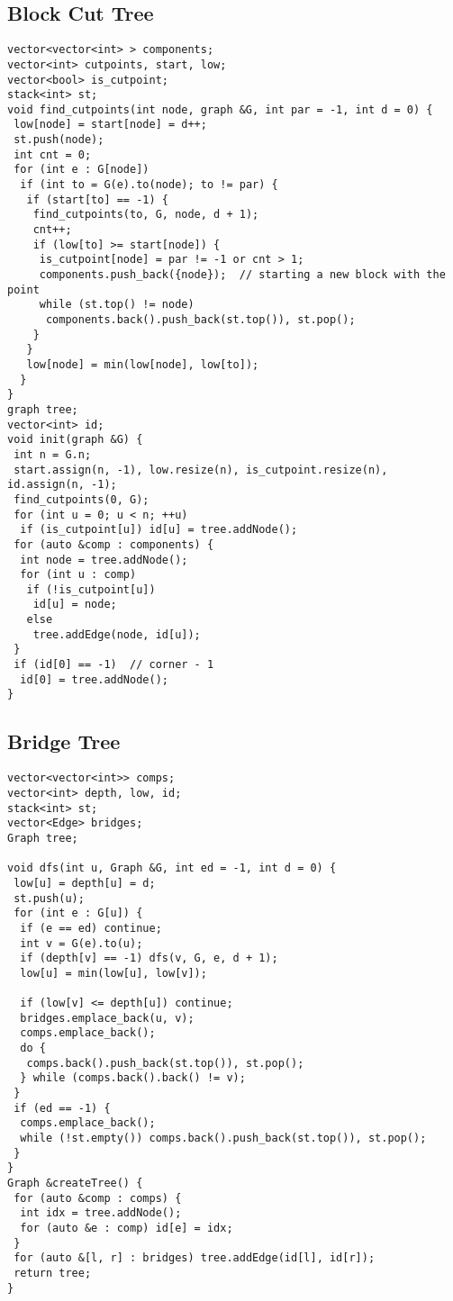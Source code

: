 \documentclass[a4paper,11pt,oneside]{article}
\begin{document}
\begin{multicols*}{\COLS}
\subsection{Block Cut Tree}
\begin{lstlisting}
vector<vector<int> > components;
vector<int> cutpoints, start, low;
vector<bool> is_cutpoint;
stack<int> st;
void find_cutpoints(int node, graph &G, int par = -1, int d = 0) {
 low[node] = start[node] = d++;
 st.push(node);
 int cnt = 0;
 for (int e : G[node])
  if (int to = G(e).to(node); to != par) {
   if (start[to] == -1) {
    find_cutpoints(to, G, node, d + 1);
    cnt++;
    if (low[to] >= start[node]) {
     is_cutpoint[node] = par != -1 or cnt > 1;
     components.push_back({node});  // starting a new block with the point
     while (st.top() != node)
      components.back().push_back(st.top()), st.pop();
    }
   }
   low[node] = min(low[node], low[to]);
  }
}
graph tree;
vector<int> id;
void init(graph &G) {
 int n = G.n;
 start.assign(n, -1), low.resize(n), is_cutpoint.resize(n), id.assign(n, -1);
 find_cutpoints(0, G);
 for (int u = 0; u < n; ++u)
  if (is_cutpoint[u]) id[u] = tree.addNode();
 for (auto &comp : components) {
  int node = tree.addNode();
  for (int u : comp)
   if (!is_cutpoint[u])
    id[u] = node;
   else
    tree.addEdge(node, id[u]);
 }
 if (id[0] == -1)  // corner - 1
  id[0] = tree.addNode();
}
\end{lstlisting}
\subsection{Bridge Tree}
\begin{lstlisting}
vector<vector<int>> comps;
vector<int> depth, low, id;
stack<int> st;
vector<Edge> bridges;
Graph tree;

void dfs(int u, Graph &G, int ed = -1, int d = 0) {
 low[u] = depth[u] = d;
 st.push(u);
 for (int e : G[u]) {
  if (e == ed) continue;
  int v = G(e).to(u);
  if (depth[v] == -1) dfs(v, G, e, d + 1);
  low[u] = min(low[u], low[v]);

  if (low[v] <= depth[u]) continue;
  bridges.emplace_back(u, v);
  comps.emplace_back();
  do {
   comps.back().push_back(st.top()), st.pop();
  } while (comps.back().back() != v);
 }
 if (ed == -1) {
  comps.emplace_back();
  while (!st.empty()) comps.back().push_back(st.top()), st.pop();
 }
}
Graph &createTree() {
 for (auto &comp : comps) {
  int idx = tree.addNode();
  for (auto &e : comp) id[e] = idx;
 }
 for (auto &[l, r] : bridges) tree.addEdge(id[l], id[r]);
 return tree;
}


\end{lstlisting}
\end{multicols*}
\end{document}
